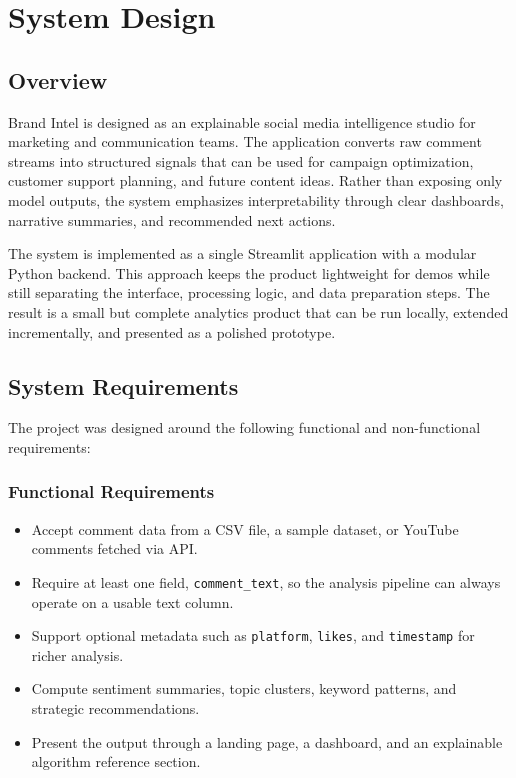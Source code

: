 \chapter{System Design}

\section{Overview}
Brand Intel is designed as an explainable social media intelligence studio for marketing and communication teams. The application converts raw comment streams into structured signals that can be used for campaign optimization, customer support planning, and future content ideas. Rather than exposing only model outputs, the system emphasizes interpretability through clear dashboards, narrative summaries, and recommended next actions.

The system is implemented as a single Streamlit application with a modular Python backend. This approach keeps the product lightweight for demos while still separating the interface, processing logic, and data preparation steps. The result is a small but complete analytics product that can be run locally, extended incrementally, and presented as a polished prototype.

\section{System Requirements}
The project was designed around the following functional and non-functional requirements:

\subsection{Functional Requirements}
\begin{itemize}
    \item Accept comment data from a CSV file, a sample dataset, or YouTube comments fetched via API.
    \item Require at least one field, \texttt{comment\_text}, so the analysis pipeline can always operate on a usable text column.
    \item Support optional metadata such as \texttt{platform}, \texttt{likes}, and \texttt{timestamp} for richer analysis.
    \item Compute sentiment summaries, topic clusters, keyword patterns, and strategic recommendations.
    \item Present the output through a landing page, a dashboard, and an explainable algorithm reference section.
\end{itemize}

